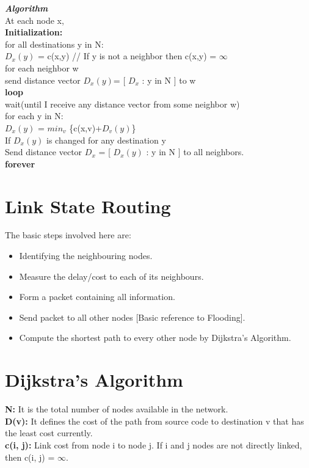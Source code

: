 \documentclass[12pt]{article}
\begin{document}
\textit{\textbf{Algorithm}} \\

At each node x, \\
\textbf{Initialization:} \\
for all destinations y in N: \\
$D_x(y)$ = c(x,y) // If y is not a neighbor then c(x,y) = $\infty$ \\
for each neighbor w \\
send distance vector $D_x(y)$= [ $D_x$ : y in N ] to w \\
\textbf{loop} \\
wait(until I receive any distance vector from some neighbor w) \\
for each y in N: \\
$D_x(y)$ = $min_v$ \{c(x,v)+$D_v(y)$\} \\
If $D_x(y)$ is changed for any destination y \\
Send distance vector $D_x$ = [ $D_x(y)$ : y in N ] to all neighbors. \\
\textbf{forever}


\section{Link State Routing}
    The basic steps involved here are:
    \begin{itemize}
        \item Identifying the neighbouring nodes.
        \item Measure the delay/cost to each of its neighbours.
        \item Form a packet containing all information.
        \item Send packet to all other nodes [Basic reference to Flooding].
        \item Compute the shortest path to every other node by Dijkstra's Algorithm.
    \end{itemize}
    
\section{Dijkstra's Algorithm}

\textbf{N:} It is the total number of nodes available in the network. \\
\textbf{D(v):} It defines the cost of the path from source code to
destination v that has the least cost currently. \\
\textbf{c(i, j):} Link cost from node i to node j. If i and j nodes are not
directly linked, then c(i, j) = $\infty$.
\end{document}
